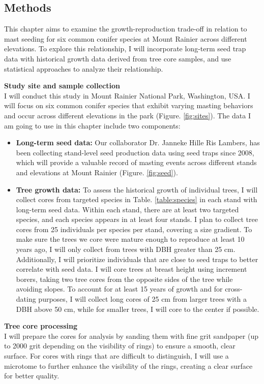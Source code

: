 \documentclass[11pt,letter]{article}
\begin{document}
\subsection{Methods}
This chapter aims to examine the growth-reproduction trade-off in relation to mast seeding for six common conifer species at Mount Rainier across different elevations. To explore this relationship, I will incorporate long-term seed trap data with historical growth data derived from tree core samples, and use statistical approaches to analyze their relationship.\par

\textbf{Study site and sample collection}\\
I will conduct this study in Mount Rainier National Park, Washington, USA. I will focus on six common conifer species that exhibit varying masting behaviors and occur across different elevations in the park (Figure. \ref{fig:sites}). The data I am going to use in this chapter include two components:	
\begin{itemize}
	\item \textbf{Long-term seed data:} Our collaborator Dr. Janneke Hille Ris Lambers, has been collecting stand-level seed production data using seed traps since 2008, which will provide a valuable record of masting events across different stands and elevations at Mount Rainier  (Figure. \ref{fig:seed}).
	\item \textbf{Tree growth data:}  To assess the historical growth of individual trees, I will collect cores from targeted species in Table. \ref{table:species} in each stand with long-term seed data. Within each stand, there are at least two targeted species, and each species appears in at least four stands. I plan to collect tree cores from 25 individuals per species per stand, covering a size gradient. To make sure the trees we core were mature enough to reproduce at least 10 years ago, I will only collect from trees with DBH greater than 25 cm. Additionally, I will prioritize individuals that are close to seed traps to better correlate with seed data. I will core trees at breast height using increment borers, taking two tree cores from the opposite sides of the tree while avoiding slopes. To account for at least 15 years of growth and for cross-dating purposes, I will collect long cores of 25 cm from larger trees with a DBH above 50 cm, while for smaller trees, I will core to the center if possible.
	\end{itemize}
\textbf{Tree core processing}\\
I will prepare the cores for analysis by sanding them with fine grit sandpaper (up to 2000 grit depending on the visibility of rings) to ensure a smooth, clear surface. For cores with rings that are difficult to distinguish, I will use a microtome to further enhance the visibility of the rings, creating a clear surface for better quality.\par
\end{document}
